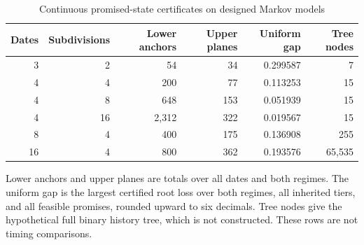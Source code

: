 \begin{table}[p]\centering
\caption{Continuous promised-state certificates on designed Markov models}\label{tab:r26-envelopes}
\small\begin{tabular}{rrrrrr}\toprule
Dates & Subdivisions & Lower anchors & Upper planes & Uniform gap & Tree nodes\\\midrule
3 & 2 & 54 & 34 & 0.299587 & 7 \\
4 & 4 & 200 & 77 & 0.113253 & 15 \\
4 & 8 & 648 & 153 & 0.051939 & 15 \\
4 & 16 & 2,312 & 322 & 0.019567 & 15 \\
8 & 4 & 400 & 175 & 0.136908 & 255 \\
16 & 4 & 800 & 362 & 0.193576 & 65,535 \\
\bottomrule\end{tabular}
\begin{minipage}{.97\textwidth}\footnotesize Lower anchors and upper planes are totals over all dates and both regimes. The uniform gap is the largest certified root loss over both regimes, all inherited tiers, and all feasible promises, rounded upward to six decimals. Tree nodes give the hypothetical full binary history tree, which is not constructed. These rows are not timing comparisons.\end{minipage}
\end{table}
